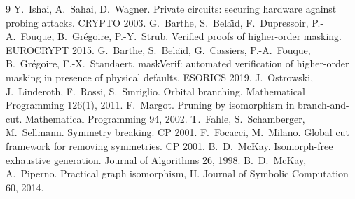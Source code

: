\documentclass[11pt,a4paper]{article}
\theoremstyle{definition}
\theoremstyle{remark}
\begin{document}
\begin{thebibliography}{9}\small
{} Y.~Ishai, A.~Sahai, D.~Wagner.  Private circuits: securing hardware against
  probing attacks.  CRYPTO 2003.
 G.~Barthe, S.~Bela\"{\i}d, F.~Dupressoir, P.-A.~Fouque, B.~Gr\'egoire,
  P.-Y.~Strub.  Verified proofs of higher-order masking.  EUROCRYPT 2015.
 G.~Barthe, S.~Bela\"{\i}d, G.~Cassiers, P.-A.~Fouque, B.~Gr\'egoire,
  F.-X.~Standaert.  maskVerif: automated verification of higher-order masking in presence of
  physical defaults.  ESORICS 2019.
 J.~Ostrowski, J.~Linderoth, F.~Rossi, S.~Smriglio.  Orbital branching.
  Mathematical Programming 126(1), 2011.
 F.~Margot.  Pruning by isomorphism in branch-and-cut.  Mathematical
  Programming 94, 2002.
 T.~Fahle, S.~Schamberger, M.~Sellmann.  Symmetry breaking.
  CP 2001.
 F.~Focacci, M.~Milano.  Global cut framework for removing symmetries.
  CP 2001.
 B.~D.~McKay.  Isomorph-free exhaustive generation.  Journal of
  Algorithms 26, 1998.
 B.~D.~McKay, A.~Piperno.  Practical graph isomorphism, II.  Journal of
  Symbolic Computation 60, 2014.
\end{thebibliography}
\end{document}
